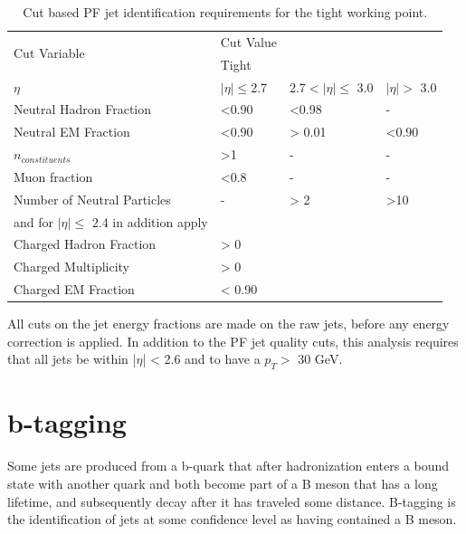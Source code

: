 \begin{table}[htbp]
    \caption{Cut based PF jet identification requirements for the tight working point.}
    \centering
    \begin{tabular}{llll}
        \hline
        \multirow{2}{*}{Cut Variable}               & Cut Value \\\cline{2-2}
                                                    & Tight\\ 
        \hline 
        $\eta$& $|\eta|\leq$2.7 &2.7$<|\eta|\leq$ 3.0  & $|\eta|>$ 3.0\\
        \hline 
        Neutral Hadron Fraction  & <0.90  & <0.98 & -\\  
        Neutral EM Fraction      & <0.90  & > 0.01 & <0.90\\
        $n_{constituents}$       & >1     & -      & - \\
        Muon fraction            & <0.8   & -      & -\\
        Number of Neutral Particles & - & > 2      & >10\\
        \hline
        and for $|\eta| \leq$ 2.4 in addition apply\\
        \hline
        Charged Hadron Fraction & > 0 \\
        Charged Multiplicity    & > 0 \\
        Charged EM Fraction     & < 0.90\\
        \hline 
    \end{tabular}
    \label{tab:PFJetID}
\end{table}

All cuts on the jet energy fractions are made on the raw jets, before any energy correction is applied. In addition to the PF jet quality cuts, this analysis requires that all jets be within |$\eta$| < 2.6 and to have a $p_{T} > $ 30 GeV. 

\section{b-tagging}
Some jets are produced from a b-quark that after hadronization enters a bound state with another quark and both become part of a B meson that has a long lifetime, and subsequently decay after it has traveled some distance. B-tagging is the identification of jets at some confidence level as having contained a B meson.

